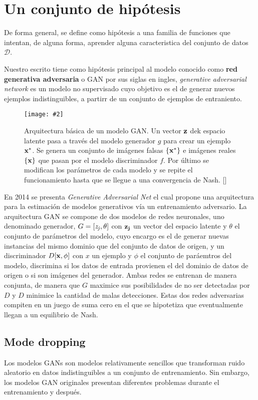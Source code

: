 \documentclass[letterpaper,12pt,oneside]{book}
\newcommand{\figura}[4]{
          \begin{figure}[H]
            \centering
            \texttt{[image: \#2]}
            \caption{#3}
            \label{#4}
          \end{figure}
                            }
\newcommand{\bb}[1]{\{#1\}}
\begin{document}
            \section{Un conjunto de hipótesis}
                De forma general, se define como hipótesis a una familia de funciones que intentan, de alguna forma, aprender alguna caracteristica del conjunto de datos $\mathcal{D}$. 

                Nuestro escrito tiene como hipótesis principal al modelo conocido como {\bf red generativa adversaria }o GAN por sus siglas en ingles, {\it generative adversarial network} es un modelo no supervisado cuyo objetivo es el de generar nuevos ejemplos indistinguibles, a partirr de un conjunto de ejemplos de entraniento.
                
                \figura{0.25}{Imagenes/Resultados/gan_arc}{Arquitectura básica de un modelo GAN. Un vector ${\bf z}$ dek espacio latente pasa a través del modelo generador $g$ para crear un ejemplo ${\bf x^*}$. Se genera un conjunto de imágenes falsas $\bb{{\bf x^*}}$ e imágenes reales $\bb{{\bf x}}$ que pasan por el modelo discriminador $f$. Por último se modifican los parámetros de cada modelo y se repite el funcionamiento hasta que se llegue a una convergencia de Nash. [\cite{prince2023understanding}]}{fig:gan_arc}

                En 2014 se presenta {\it Generative Adversarial Net} el cual propone una arquitectura para la estimación de modelos generativos vía un entrenamiento adversario. 
                La arquitectura GAN se compone de dos modelos de redes neuronales, uno denominado generador, $G = [{\it z_j}, \theta]$ con ${\bf z_j}$ un vector del espacio latente y $\theta$ el conjunto de parámetros del modelo, cuyo encargo es el de generar nuevas instancias del mismo dominio que del conjunto de datos de origen, y un discriminador $D[{\bf x}, \phi]$ con $x$ un ejemplo y $\phi$ el conjunto de paráemtros del modelo, discrimina si los datos de entrada provienen el del dominio de datos de origen o si son imágenes del generador. Ambas redes se entrenan de manera conjunta, de manera que $G$ maximice sus posibilidades de no ser detectadas por $D$ y $D$ minimice la cantidad de malas detecciones. Estas dos redes adversarias compiten en un juego de suma cero en el que se hipotetiza que eventualmente llegan a un equilibrio de Nash.

                \subsection{Mode dropping}
                    Los modelos GANs son modelos relativamente sencillos que transforman ruido aleatorio en datos indistinguibles a un conjunto de entrenamiento. Sin embargo, los modelos GAN originales presentan diferentes problemas durante el entrenamiento y después. 
\end{document}
